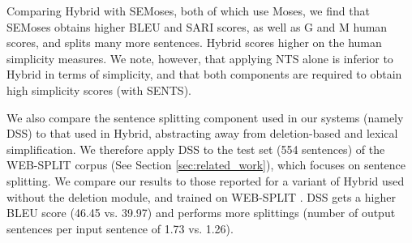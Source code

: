 \documentclass[11pt,a4paper]{article}
\begin{document}
Comparing {\sc Hybrid} with SEMoses, both of which use Moses, 
we find that SEMoses obtains higher BLEU and SARI scores, as well as G and M human scores, and splits many more sentences.
{\sc Hybrid} scores higher on the human simplicity measures. We note, however, that applying NTS alone is inferior to {\sc Hybrid}
in terms of simplicity, and that both components are required to obtain high simplicity scores (with SENTS).

We also compare the sentence splitting component used in our systems (namely DSS) to that used in {\sc Hybrid}, abstracting away from deletion-based and lexical simplification. We therefore apply DSS to the test set (554 sentences) of the WEB-SPLIT corpus \citep{N17} (See Section \ref{sec:related_work}), which focuses on sentence splitting. We compare our results to those reported for a variant of {\sc Hybrid} used without the deletion module, and trained on WEB-SPLIT \citep{N17}. DSS gets a higher BLEU score (46.45 vs. 39.97) and performs more splittings (number of output sentences per input sentence of 1.73 vs. 1.26).
\end{document}
